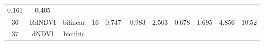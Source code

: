 \documentclass[twoside,12pt,final]{ucthesis-CA2012}
\begin{document}
\begin{ucmainmatter}
\begin{longtable}[]{@{}ccccccccccc@{}}
\begin{minipage}[t]{0.05\columnwidth}
0.161\strut
\end{minipage} & \begin{minipage}[t]{0.05\columnwidth}\centering\strut
0.405\strut
\end{minipage}\tabularnewline
\begin{minipage}[t]{0.04\columnwidth}\centering\strut
36\strut
\end{minipage} & \begin{minipage}[t]{0.11\columnwidth}\centering\strut
RdNDVI\strut
\end{minipage} & \begin{minipage}[t]{0.06\columnwidth}\centering\strut
bilinear\strut
\end{minipage} & \begin{minipage}[t]{0.08\columnwidth}\centering\strut
16\strut
\end{minipage} & \begin{minipage}[t]{0.08\columnwidth}\centering\strut
0.747\strut
\end{minipage} & \begin{minipage}[t]{0.07\columnwidth}\centering\strut
-0.983\strut
\end{minipage} & \begin{minipage}[t]{0.07\columnwidth}\centering\strut
2.503\strut
\end{minipage} & \begin{minipage}[t]{0.07\columnwidth}\centering\strut
0.678\strut
\end{minipage} & \begin{minipage}[t]{0.05\columnwidth}\centering\strut
1.695\strut
\end{minipage} & \begin{minipage}[t]{0.05\columnwidth}\centering\strut
4.856\strut
\end{minipage} & \begin{minipage}[t]{0.05\columnwidth}\centering\strut
10.52\strut
\end{minipage}\tabularnewline
\begin{minipage}[t]{0.04\columnwidth}\centering\strut
37\strut
\end{minipage} & \begin{minipage}[t]{0.11\columnwidth}\centering\strut
dNDVI\strut
\end{minipage} & \begin{minipage}[t]{0.06\columnwidth}\centering\strut
bicubic\strut
\end{minipage} & \begin{minipage}[t]{0.08\columnwidth}\centering\strut

\end{minipage}
\end{longtable}
\end{ucmainmatter}
\end{document}
